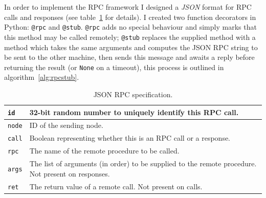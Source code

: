 \documentclass[12pt,notitlepage,a4paper]{report}
\begin{document}
	In order to implement the RPC framework I designed a \emph{JSON} format for RPC calls and responses (see table~\ref{tab:rpcjson} for details). I created two function decorators in Python: \texttt{@rpc} and \texttt{@stub}. \texttt{@rpc} adds no special behaviour and simply marks that this method may be called remotely; \texttt{@stub} replaces the supplied method with a method which takes the same arguments and computes the JSON RPC string to be sent to the other machine, then sends this message and awaits a reply before returning the result (or \texttt{None} on a timeout), this process is outlined in algorithm~\ref{alg:rpcstub}.
	\begin{table}[!ht]
		\begin{tabularx}{\textwidth}{| l | X |}
			\hline 
			\texttt{id} & 32-bit random number to uniquely identify this RPC call.\\
			\hline
			\texttt{node} & ID of the sending node.\\
			\hline
			\texttt{call} & Boolean representing whether this is an RPC call or a response.\\
			\hline
			\texttt{rpc} & The name of the remote procedure to be called.\\
			\hline
			\texttt{args} & The list of arguments (in order) to be supplied to the remote procedure. Not present on responses.\\
			\hline
			\texttt{ret} & The return value of a remote call. Not present on calls.\\
			\hline
		\end{tabularx}
	\caption{JSON RPC specification.}
	\label{tab:rpcjson}
	\end{table}
\end{document}
